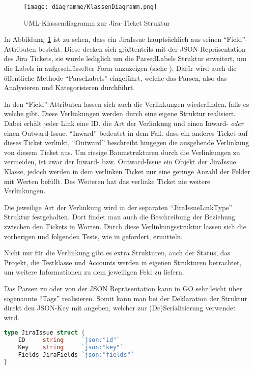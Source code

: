 \begin{figure}[H]
    \texttt{[image: diagramme/KlassenDiagramm.png]}
    \caption{UML-Klassendiagramm zur Jira-Ticket Struktur}\label{fig:classes}
\end{figure}

In Abbildung~\ref{fig:classes} ist zu sehen, dass ein JiraIssue hauptsächlich aus 
seinen ``Field''-Attributen besteht. Diese decken sich größtenteils mit der 
\gls{JSON} Repräsentation des Jira Tickets, sie wurde lediglich um die ParsedLabels Struktur 
erweitert, um die Labels in aufgeschlüsselter Form anzuzeigen (siehe ). Dafür wird auch die
öffentliche Methode ``ParseLabels'' eingeführt, welche das Parsen, also das
Analysieren und Kategorisieren durchführt. 

In den ``Field''-Attributen lassen sich auch die Verlinkungen wiederfinden, falls 
es welche gibt. Diese Verlinkungen werden durch eine eigene Struktur realisiert.
Dabei erhält jeder Link eine ID, die Art der Verlinkung und einen Inward- \textit{oder}
einen Outward-Issue. ``Inward'' bedeutet in dem Fall, dass ein anderes Ticket auf dieses
Ticket verlinkt, ``Outward'' beschreibt hingegen die ausgehende Verlinkung von 
diesem Ticket aus. Um riesige Baumstrukturen durch die Verlinkungen zu vermeiden, 
ist zwar der Inward- bzw. Outward-Issue ein Objekt der JiraIssue Klasse, jedoch 
werden in dem verlinken Ticket nur eine geringe Anzahl der Felder mit Werten befüllt.
Des Weiteren hat das verlinke Ticket nie weitere Verlinkungen.

Die jeweilige Art der Verlinkung wird in der separaten 
``JiraIssueLinkType'' Struktur festgehalten. Dort findet man auch die Beschreibung
der Beziehung zwischen den Tickets in Worten. Durch diese Verlinkungsstruktur
lassen sich die vorherigen und folgenden Tests, wie in 
gefordert, ermitteln.

Nicht nur für die Verlinkung gibt es extra Strukturen, auch der Status, das Projekt, 
die Testklasse und Accounts werden in eigenen Strukturen betrachtet, um weitere
Informationen zu dem jeweiligen Feld zu liefern.

Das Parsen zu oder von der \gls{JSON} Repräsentation kann in GO sehr leicht über
sogenannte ``Tags'' realisieren. Somit kann man bei der Deklaration der Struktur
direkt den \gls{JSON}-Key mit angeben, welcher zur (De)Serialisierung verwendet wird.

\begin{lstlisting}[caption=Go Strukturdefinition mit JSON Tags,language=Go]
type JiraIssue struct {
    ID     string     `json:"id"`
    Key    string     `json:"key"`
    Fields JiraFields `json:"fields"`
}
\end{lstlisting}

